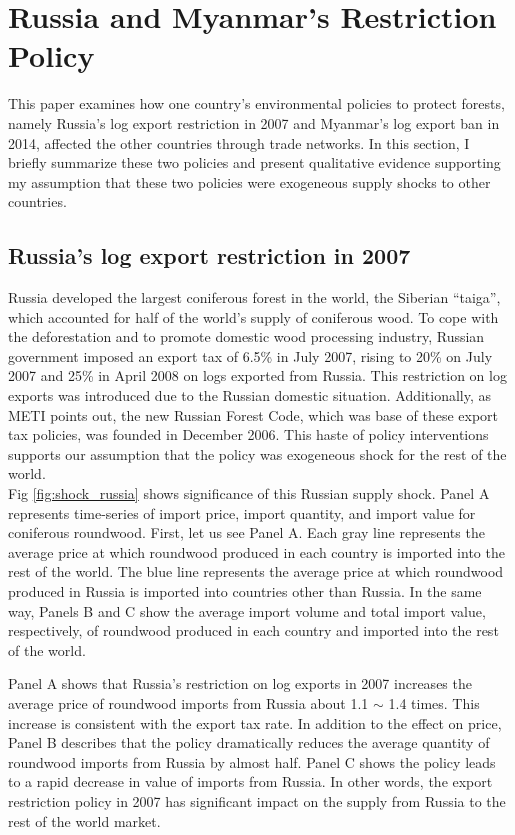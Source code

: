 \documentclass[a4paper,12pt]{article}
\begin{document}
\section{Russia and Myanmar's Restriction Policy}
This paper examines how one country's environmental policies to protect forests, namely Russia's log export restriction in 2007 and Myanmar's log export ban in 2014, affected the other countries through trade networks. In this section, I briefly summarize these two policies and present qualitative evidence supporting my assumption that these two policies were exogeneous supply shocks to other countries.

\subsection{Russia's log export restriction in 2007}
Russia developed the largest coniferous forest in the world, the Siberian ``taiga'', which accounted for half of the world's supply of coniferous wood.  To cope with the deforestation and to promote domestic wood processing industry, Russian government imposed an export tax of 6.5\% in July 2007, rising to 20\% on July 2007 and 25\% in April 2008 on logs exported from Russia. This restriction on log exports was introduced due to the Russian domestic situation. Additionally, as METI points out, the new Russian Forest Code, which was base of these export tax policies, was founded in December 2006. This haste of policy interventions supports our assumption that the policy was exogeneous shock for the rest of the world. \\

Fig \ref{fig:shock_russia} shows significance of this Russian supply shock. Panel A represents time-series of import price, import quantity, and import value for coniferous roundwood. First, let us see Panel A. Each gray line represents the average price at which roundwood produced in each country is imported into the rest of the world. The blue line represents the average price at which roundwood produced in Russia is imported into countries other than Russia. In the same way, Panels B and C show the average import volume and total import value, respectively, of roundwood produced in each country and imported into the rest of the world.

Panel A shows that Russia's restriction on log exports in 2007 increases the average price of roundwood imports from Russia about 1.1 $\sim$ 1.4 times. This increase is consistent with the export tax rate. In addition to the effect on price, Panel B describes that the policy dramatically reduces the average quantity of roundwood imports from Russia by almost half. Panel C shows the policy leads to a rapid decrease in value of imports from Russia. In other words, the export restriction policy in 2007 has significant impact on the supply from Russia to the rest of the world market. 
\end{document}
